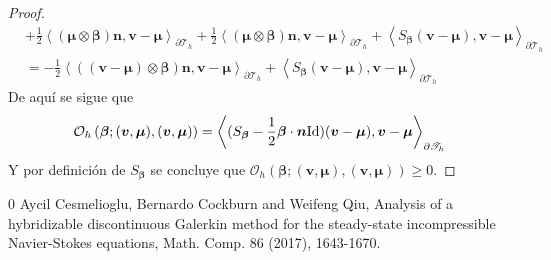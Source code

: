 \documentclass[10pt,a4paper]{report}
\newcommand{\bs}{\boldsymbol}
\newcommand{\Th}{\mathscr{T}_{h}}
\providecommand{\PI}[2]{\left\langle #1,#2  \right\rangle}
\begin{document}
\begin{proof}
\begin{align*}
        	&+ \frac{1}{2}\PI{(\bs{\mu}\otimes\bs{\beta})\bs{n}}{\bs{v}-\bs{\mu}}_{\partial\Th} +\frac{1}{2}\PI{(\bs{\mu}\otimes\bs{\beta})\bs{n}}{\bs{v}-\bs{\mu}}_{\partial\Th} +  \PI{S_{\bs{\beta}}(\bs{v}-\bs{\mu})}{\bs{v}-\bs{\mu}}_{\partial\Th}\\
        	&= -\frac{1}{2}\PI{((\bs{v}-\bs{\mu})\otimes\bs{\beta})\bs{n}}{\bs{v}-\bs{\mu}}_{\partial\Th}+  \PI{S_{\bs{\beta}}(\bs{v}-\bs{\mu})}{\bs{v}-\bs{\mu}}_{\partial\Th}
        \end{align*}
        De aquí se sigue que
        \begin{align*}
        	\mathcal{O}_{h}\left(\bs{\beta};(\bs{v},\bs{\mu}),(\bs{v},\bs{\mu})\right) = \PI{(S_{\bs{\beta}}-\frac{1}{2}\bs{\beta}\cdot\bs{n}\textup{Id})(\bs{v}-\bs{\mu})}{\bs{v}-\bs{\mu}}_{\partial\Th}
        \end{align*}
        Y por definición de $S_{\bs{\beta}}$ se concluye que $	\mathcal{O}_{h}\left(\bs{\beta};(\bs{v},\bs{\mu}),(\bs{v},\bs{\mu})\right)\geq 0$.
    \end{proof}
    \begin{thebibliography}{0}
    	 Aycil Cesmelioglu, Bernardo Cockburn and Weifeng Qiu, Analysis of a hybridizable discontinuous Galerkin
    	method for the steady-state incompressible Navier-Stokes equations, Math. Comp. 86 (2017), 1643-1670.
    \end{thebibliography}
\end{document}
